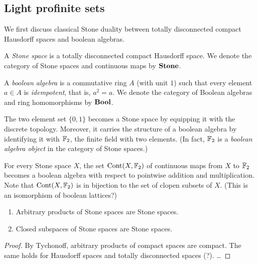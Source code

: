 \documentclass{notes}
\begin{document}
\subsection{Light profinite sets}
\textcolor{black}{}
{\lukas
We first discuss classical Stone duality between totally disconnected compact Hausdorff spaces and boolean algebras.

\begin{definition}
  A \emph{Stone space} is a totally disconnected compact Hausdorff space.
  We denote the category of Stone spaces and continuous maps by \(\mathbf{Stone}\).
\end{definition}

\begin{definition}
  A \emph{boolean algebra} is a commutative ring \(A\) (with unit \(1\)) such that every element \(a\in A\) is \emph{idempotent}, that is, \(a^2=a\).
  We denote the category of Boolean algebras and ring homomorphisms by \(\mathbf{Bool}\).
\end{definition}

\begin{example}
  The two element set \(\{0,1\}\) becomes a Stone space by equipping it with the discrete topology.
  Moreover, it carries the structure of a boolean algebra by identifying it with \({\mathbb{F}}_2\), the finite field with two elements.
  (In fact, \({\mathbb{F}}_2\) is a \emph{boolean algebra object} in the category of Stone spaces.)
\end{example}

\begin{example}
  For every Stone space \(X\), the set \({\rm Cont}(X,{\mathbb{F}}_2)\) of continuous maps from \(X\) to \({\mathbb{F}}_2\) becomes a boolean algebra with respect to pointwise addition and multiplication.
  Note that \({\rm Cont}(X,{\mathbb{F}}_2)\) is in bijection to the set of clopen subsets of \(X\).
  (This is an isomorphism of boolean lattices?)
\end{example}

\begin{lemma}
  \leavevmode
  \begin{enumerate}
    \item
      Arbitrary products of Stone spaces are Stone spaces.
    \item
      Closed subspaces of Stone spaces are Stone spaces.
  \end{enumerate}
\end{lemma}
\begin{proof}
  By Tychonoff, arbitrary products of compact spaces are compact.
  The same holds for Hausdorff spaces and totally disconnected spaces (?).
  \dots
\end{proof}

}
\end{document}
